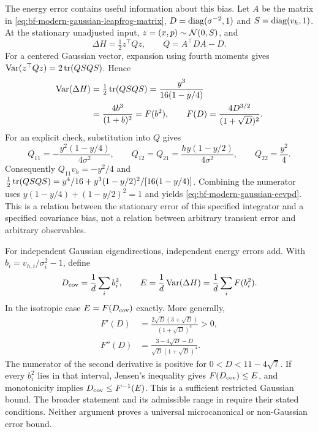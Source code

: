 The energy error contains useful information about this bias. Let $A$ be the
matrix in \eqref{eq:bf-modern-gaussian-leapfrog-matrix},
$D=\operatorname{diag}(\sigma^{-2},1)$ and $S=\operatorname{diag}(v_h,1)$. At the stationary
unadjusted input, $z=(x,p)\sim\mathcal{N}(0,S)$, and
\begin{equation}
 \Delta H=\tfrac12 z^\top Qz,\qquad Q=A^\top D A-D.
 \label{eq:bf-modern-gaussian-error-quadratic}
\end{equation}
For a centered Gaussian vector, expansion using fourth moments gives
$\operatorname{Var}(z^\top Qz)=2\operatorname{tr}(QSQS)$. Hence
\begin{align}
 \operatorname{Var}(\Delta H)&=\tfrac12\operatorname{tr}(QSQS)
          =\frac{y^3}{16(1-y/4)}\\
 &=\frac{4b^3}{(1+b)^2}
   =F(b^2),\qquad F(D)=\frac{4D^{3/2}}{(1+\sqrt D)^2}.
 \label{eq:bf-modern-gaussian-eevpd}
\end{align}
For an explicit check, substitution into $Q$ gives
\begin{equation}
 Q_{11}=-\frac{y^2(1-y/4)}{4\sigma^2},\qquad
 Q_{12}=Q_{21}=\frac{hy(1-y/2)}{4\sigma^2},\qquad
 Q_{22}=\frac{y^2}{4}.
 \label{eq:bf-modern-gaussian-error-entries}
\end{equation}
Consequently $Q_{11}v_h=-y^2/4$ and
$\tfrac12\operatorname{tr}(QSQS)=y^4/16+
y^3(1-y/2)^2/[16(1-y/4)]$. Combining the numerator uses
$y(1-y/4)+(1-y/2)^2=1$ and yields
\eqref{eq:bf-modern-gaussian-eevpd}. This is a relation between the
stationary error of this specified integrator and a specified covariance
bias, not a relation between arbitrary transient error and arbitrary
observables.

For independent Gaussian eigendirections, independent energy errors add.
With $b_i=v_{h,i}/\sigma_i^2-1$, define
\begin{equation}
 D_{\rm cov}=\frac1d\sum_i b_i^2,\qquad
 E=\frac1d\operatorname{Var}(\Delta H)=\frac1d\sum_i F(b_i^2).
 \label{eq:bf-modern-eevpd-multivariate}
\end{equation}
In the isotropic case $E=F(D_{\rm cov})$ exactly. More generally,
\begin{align}
 F'(D)&=\frac{2\sqrt D(3+\sqrt D)}{(1+\sqrt D)^3}>0,\\
 F''(D)&=\frac{3-4\sqrt D-D}{\sqrt D(1+\sqrt D)^4}.
 \label{eq:bf-modern-bias-function-derivatives}
\end{align}
The numerator of the second derivative is positive for
$0<D<11-4\sqrt7$. If every $b_i^2$ lies in that interval, Jensen's
inequality gives $F(D_{\rm cov})\leq E$, and monotonicity implies
$D_{\rm cov}\leq F^{-1}(E)$. This is a sufficient restricted Gaussian
bound. The broader statement and its admissible range in
\citet[Theorem 4.2 and Appendix B]{robnik2026unadjusted} require their
stated conditions. Neither argument proves a universal microcanonical or
non-Gaussian error bound.

